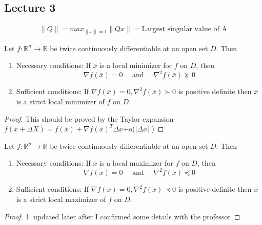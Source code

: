 
% 
\subsection{Lecture 3}

\begin{definition}
    \begin{align*}
        \|Q\|=max_{\|x\|=1}\|Qx\|= \text{Largest singular value of A}
    \end{align*}
\end{definition}

\begin{theorem}
  Let $f: \mathbb R^n \to \mathbb R$ be twice continuously differentiable at an open set $D$. Then
  \begin{enumerate}
    \item Necessary conditions: If $\bar{x}$ is a local minimizer for $f$ on $D$, then $$\nabla f(\bar{x})=0 \quad \text{ and } \quad \nabla^2f(\bar{x}) \succeq 0
    $$
    \item Sufficient conditions: If $\nabla f(\bar{x})=0,\nabla^2f(\bar{x}) \succ 0$ is positive definite then $\bar{x}$ is a strict local minimizer of $f$ on $D$.
  \end{enumerate}
\end{theorem}
\begin{proof}
  This should be proved by the Taylor expansion
  $f(\bar{x}+\Delta X)=f(\bar{x})+\nabla f(\bar{x})^T \Delta x$+o($|\Delta x|$ ) 
\end{proof}
\begin{theorem}
  Let $f: \mathbb R^n \to \mathbb R$ be twice continuously differentiable at an open set $D$. Then
  \begin{enumerate}
    \item Necessary conditions: If $\bar{x}$ is a local maximizer for $f$ on $D$, then $$\nabla f(\bar{x})=0 \quad \text{ and } \quad \nabla^2f(\bar{x}) \preceq 0
    $$
    \item Sufficient conditions: If $\nabla f(\bar{x})=0,\nabla^2f(\bar{x}) \prec 0$ is positive definite then $\bar{x}$ is a strict local maximizer of $f$ on $D$.
  \end{enumerate}
\end{theorem}
\begin{proof}
    1. updated later after I confirmed some details with the professor
\end{proof}
